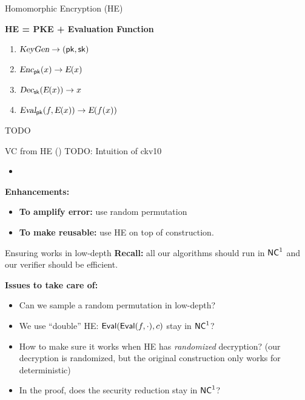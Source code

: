 \def\E{\func{E}}

\begin{frame}{Homomorphic Encryption (HE)}
	\begin{center} \textbf{HE = PKE + Evaluation Function} \end{center}
	\begin{enumerate}
		\item ${\textsl{KeyGen}} \to (\mathsf{pk}, \mathsf{sk})$
		\item $\func{Enc}_{\pk}(x) \to \E(x)$
		\item $\func{Dec}_{\sk}(\E(x)) \to x$
		\pause  
		\item $\func{Eval}_{\pk}(f, \E(x)) \to \E(f(x))$
	\end{enumerate}
	\pause
	
	\begin{result}
		TODO
	\end{result}
\end{frame}

\begin{frame}{VC from HE (\cite{ckv10})}
	TODO: Intuition of ckv10
	\begin{itemize}
		\item 
	\end{itemize}
	\pause
	\textbf{Enhancements:}
	\begin{itemize}
		\item \textbf{To amplify error:} use random permutation
		\item \textbf{To make reusable:} use HE  on top of construction.
	\end{itemize}
\end{frame}

\begin{frame}{Ensuring \cite{ckv10} works in low-depth}
	\textbf{Recall:} all our algorithms should run in ${\mathsf{NC}}^1$ and our verifier should be efficient.
	
	\textbf{Issues to take care of: }
	\begin{itemize}
		\item Can we sample a random permutation in low-depth?
		\item We use ``double'' HE: $\mathsf{Eval}(\mathsf{Eval}(f, \cdot), c)$ stay in ${\mathsf{NC}}^1$?
		\item How to make sure it works when HE has \textit{randomized} decryption? (our decryption is randomized, but the original construction only works for deterministic)
		\item In the proof, does the security reduction stay in ${\mathsf{NC}}^1$?
	\end{itemize}
\end{frame}

